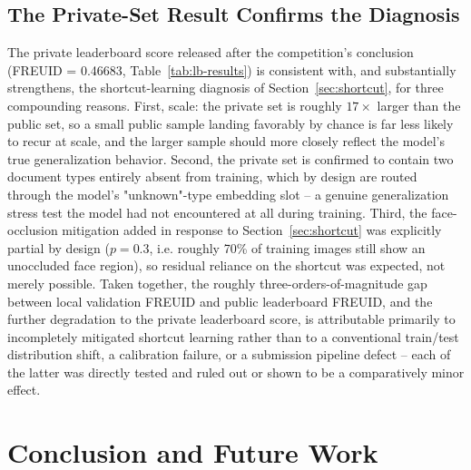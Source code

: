 \documentclass{article}
\begin{document}
\subsection{The Private-Set Result Confirms the Diagnosis}
\label{sec:gap-confirmed}

The private leaderboard score released after the competition's conclusion
(FREUID = 0.46683, Table~\ref{tab:lb-results}) is consistent with, and
substantially strengthens, the shortcut-learning diagnosis of
Section~\ref{sec:shortcut}, for three compounding reasons. First, scale:
the private set is roughly $17\times$ larger than the public set, so a
small public sample landing favorably by chance is far less likely to
recur at scale, and the larger sample should more closely reflect the
model's true generalization behavior. Second, the private set is confirmed
to contain two document types entirely absent from training, which by
design are routed through the model's "unknown"-type embedding slot --
a genuine generalization stress test the model had not encountered at all
during training. Third, the face-occlusion mitigation added in response to
Section~\ref{sec:shortcut} was explicitly partial by design ($p{=}0.3$,
i.e. roughly 70\% of training images still show an unoccluded face region),
so residual reliance on the shortcut was expected, not merely possible.
Taken together, the roughly three-orders-of-magnitude gap between local
validation FREUID and public leaderboard FREUID, and the further
degradation to the private leaderboard score, is attributable primarily to
incompletely mitigated shortcut learning rather than to a conventional
train/test distribution shift, a calibration failure, or a submission
pipeline defect -- each of the latter was directly tested and ruled out or
shown to be a comparatively minor effect.

\section{Conclusion and Future Work}
\label{sec:conclusion}
\end{document}
